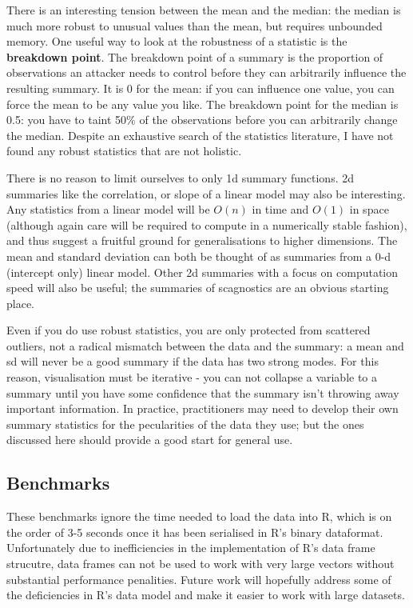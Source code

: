 \documentclass[journal]{vgtc}                %
\begin{document}
There is an interesting tension between the mean and the median: the median is much more robust to unusual values than the mean, but requires unbounded memory. One useful way to look at the robustness of a statistic is the {\bf breakdown point}.  The breakdown point of a summary is the proportion of observations an attacker needs to control before they can arbitrarily influence the resulting summary. It is 0 for the mean: if you can influence one value, you can force the mean to be any value you like. The breakdown point for the median is 0.5: you have to taint 50\% of the observations before you can arbitrarily change the median.  Despite an exhaustive search of the statistics literature, I have not found any robust statistics that are not holistic.

There is no reason to limit ourselves to only 1d summary functions. 2d summaries like the correlation, or slope of a linear model may also be interesting. Any statistics from a linear model will be $O(n)$ in time and $O(1)$ in space (although again care will be required to compute in a numerically stable fashion), and thus suggest a fruitful ground for generalisations to higher dimensions.  The mean and standard deviation can both be thought of as summaries from a 0-d (intercept only) linear model. Other 2d summaries with a focus on computation speed will also be useful; the summaries of scagnostics \citep{wilkinson:2005} are an obvious starting place.

Even if you do use robust statistics, you are only protected from scattered outliers, not a radical mismatch between the data and the summary: a mean and sd will never be a good summary if the data has two strong modes. For this reason, visualisation must be iterative - you can not collapse a variable to a summary until you have some confidence that the summary isn't throwing away important information. In practice, practitioners may need to develop their own summary statistics for the pecularities of the data they use; but the ones discussed here should provide a good start for general use.

\subsection{Benchmarks}

These benchmarks ignore the time needed to load the data into R, which is on the order of 3-5 seconds once it has been serialised in R's binary dataformat.  Unfortunately due to inefficiencies in the implementation of R's data frame strucutre, data frames can not be used to work with very large vectors without substantial performance penalities. Future work will hopefully address some of the deficiencies in R's data model and make it easier to work with large datasets.
\end{document}
